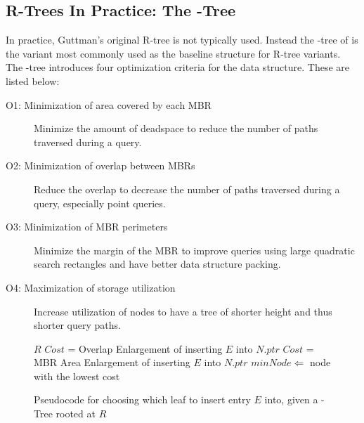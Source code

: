 \subsection{R-Trees In Practice: The \rstar-Tree}
\label{sec:variants}
In practice, Guttman's original R-tree is not typically used. Instead the 
\rstar-tree of \cite{beckmannkriegelschneiderseeger90} is the variant most 
commonly used as the baseline structure for R-tree variants. The 
\rstar-tree introduces four optimization criteria for the data structure. 
These are listed below:

\begin{description}
	\item[O1: Minimization of area covered by each MBR] Minimize the amount of 
		deadspace to reduce the number of paths traversed during a query.
	\item[O2: Minimization of overlap between MBRs] Reduce the overlap to decrease the
		number of paths traversed during a query, especially point queries.
	\item[O3: Minimization of MBR perimeters] Minimize the margin of the MBR to 
		improve queries using large quadratic search rectangles and have better 
		data structure packing.
	\item[O4: Maximization of storage utilization] Increase utilization of nodes to 
		have a tree of shorter height and thus shorter query paths.
\end{description}

\begin{figure}[b!]
	\begin{algorithmic}
				\Return $R$
			\Else
						\State $Cost$ = Overlap Enlargement of inserting $E$ into $N.ptr$
					\Else
						\State $Cost$ = MBR Area Enlargement of inserting $E$ into $N.ptr$
					\EndIf
				\EndFor
				\State $minNode \Leftarrow$ node with the lowest cost
			\EndIf
		\EndFunction
	\end{algorithmic}
	\caption{Pseudocode for choosing which leaf to insert entry $E$ into, given a 
	\rstar-Tree rooted at $R$}
	\label{fig:R*-Tree_ChooseLeaf}
\end{figure}

